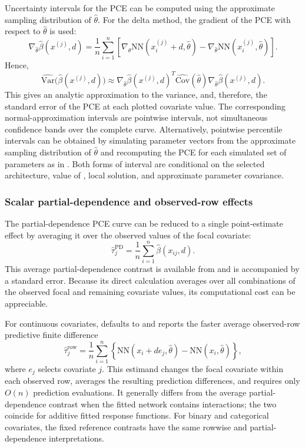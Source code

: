 Uncertainty intervals for the PCE can be computed using the approximate sampling distribution of \(\hat{\theta}\).
For the delta method, the gradient of the PCE with respect to \(\hat{\theta}\) is used: \[
 \nabla_{\hat{\theta}}\hat{\beta}(x^{(j)},d)
 =
 \frac{1}{n}
 \sum_{i=1}^n
 \left[
   \nabla_{\hat{\theta}}\mathrm{NN}(x_i^{(j)} + d, \hat{\theta})
   -
   \nabla_{\hat{\theta}}\mathrm{NN}(x_i^{(j)}, \hat{\theta})
 \right].
\] Hence, \[
  \widehat{\mathrm{Var}}\big(\hat{\beta}(x^{(j)}, d)\big)
  \approx
  \nabla_{\hat{\theta}}\hat{\beta}(x^{(j)},d)^T
  \widehat{\mathrm{Cov}}(\hat{\theta})
  \nabla_{\hat{\theta}}\hat{\beta}(x^{(j)},d).
\] This gives an analytic approximation to the variance, and, therefore, the standard error of the PCE at each plotted covariate value.
The corresponding normal-approximation intervals are pointwise intervals, not simultaneous confidence bands over the complete curve.
Alternatively, pointwise percentile intervals can be obtained by simulating parameter vectors from the approximate sampling distribution of \(\hat{\theta}\) and recomputing the PCE for each simulated set of parameters as in \citet{mandel2013simulation}.
Both forms of interval are conditional on the selected architecture, value of , local solution, and approximate parameter covariance.

\subsubsection{Scalar partial-dependence and observed-row effects}\label{scalar-partial-dependence-and-observed-row-effects}

The partial-dependence PCE curve can be reduced to a single point-estimate effect by averaging it over the observed values of the focal covariate: \[
   \hat{\tau}^{\mathrm{PD}}_j
   =
   \frac{1}{n}
   \sum_{i=1}^n
   \hat{\beta}(x_{ij}, d).
\] This average partial-dependence contrast is available from  and is accompanied by a standard error.
Because its direct calculation averages over all combinations of the observed focal and remaining covariate values, its computational cost can be appreciable.

For continuous covariates,  defaults to  and reports the faster average observed-row predictive finite difference
\[
  \hat{\tau}^{\mathrm{row}}_j
  =
  \frac{1}{n}
  \sum_{i=1}^n
  \left\{
    \mathrm{NN}(x_i + d e_j, \hat{\theta})
    -
    \mathrm{NN}(x_i, \hat{\theta})
  \right\},
\]
where \(e_j\) selects covariate \(j\).
This estimand changes the focal covariate within each observed row, averages the resulting prediction differences, and requires only \(O(n)\) prediction evaluations.
It generally differs from the average partial-dependence contrast when the fitted network contains interactions; the two coincide for additive fitted response functions.
For binary and categorical covariates, the fixed reference contrasts have the same rowwise and partial-dependence interpretations.

